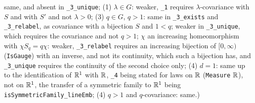 \begin{lemma}
{same, and absent in \texttt{\_3\_unique}; (1) $\lambda \in G$: weaker, \texttt{\_1} requires
$\lambda$-covariance with $S$ and with $S'$ and not $\lambda > 0$; (3) $q \in G$, $q > 1$: same in
\texttt{\_3\_exists} and \texttt{\_3\_relabel}, as covariance with a bijection $S$ and $1 < q$;
weaker in \texttt{\_3\_unique}, which requires the covariance and not $q > 1$; $\chi$ an increasing
homeomorphism with $\chi S_q = q\chi$: weaker, \texttt{\_3\_relabel} requires an increasing bijection
of $[0,\infty)$ (\texttt{IsGauge}) with an inverse, and not its continuity, which such a bijection
has, and \texttt{\_3\_unique} requires the continuity of the second choice only; (4) $d = 1$: same up to
the identification of $\mathbb{R}^1$ with $\mathbb{R}$, \texttt{\_4} being stated for laws on $\mathbb{R}$
(\texttt{Measure} $\mathbb{R}$), not on $\mathbb{R}^1$, the transfer of a symmetric family to $\mathbb{R}^1$ being
\texttt{isSymmetricFamily\_lineEmb}; (4) $q > 1$ and $q$-covariance: same.)}
\end{lemma}

